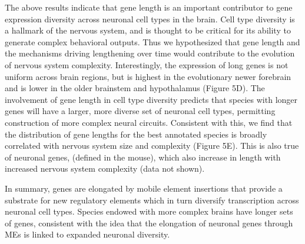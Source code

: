 The above results indicate that gene length is an important contributor to gene expression diversity across neuronal cell types in the brain. Cell type diversity is a hallmark of the nervous system, and is thought to be critical for its ability to generate complex behavioral outputs. Thus we hypothesized that gene length and the mechanisms driving lengthening over time would contribute to the evolution of nervous system complexity. Interestingly, the expression of long genes is not uniform across brain regions, but is highest in the evolutionary newer forebrain and is lower in the older brainstem and hypothalamus (Figure 5D). 
The involvement of gene length in cell type diversity predicts that species with longer genes will have a larger, more diverse set of neuronal cell types, permitting construction of more complex neural circuits. Consistent with this, we find that the distribution of gene lengths for the best annotated species is broadly correlated with nervous system size and complexity (Figure 5E). This is also true of neuronal genes, (defined in the mouse), which also increase in length with increased nervous system complexity (data not shown). 

In summary, genes are elongated by mobile element insertions that provide a substrate for new 
regulatory elements which in turn diversify transcription across neuronal cell types. Species endowed with more complex brains have longer sets of genes, consistent with the idea that the elongation of neuronal genes through MEs is linked to expanded neuronal diversity.




